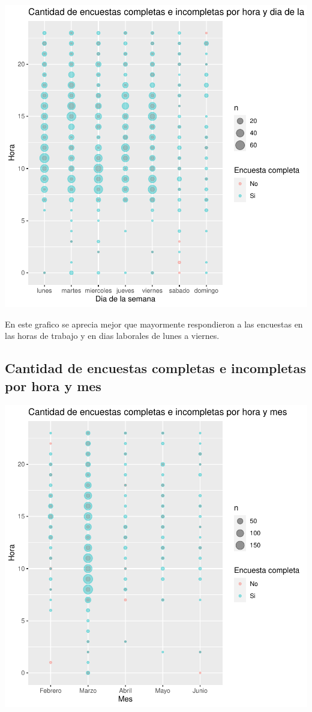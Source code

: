 \documentclass{article}
\begin{document}
\includegraphics{seguimientov3-009}

En este grafico se aprecia mejor que mayormente respondieron a las encuestas en las horas de trabajo y en dias laborales de lunes a viernes.

\subsection{Cantidad de encuestas completas e incompletas por hora y mes}

\includegraphics{seguimientov3-010}
\end{document}
